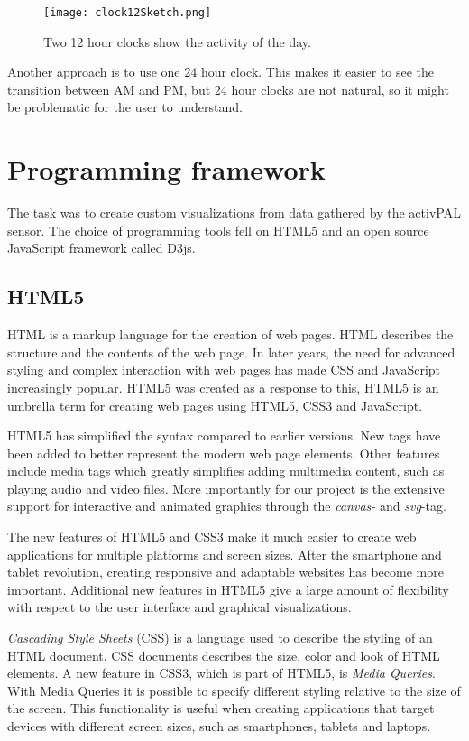 \begin{figure}[h!]
	\centering
		\texttt{[image: clock12Sketch.png]}
		\caption[T3 sketch]{Two 12 hour clocks show the activity of the day.}
		\label{fig:clock12}
\end{figure}

Another approach is to use one 24 hour clock. This makes it easier to see the transition between AM and PM, but 24 hour clocks are not natural, so it might be problematic for the user to understand.

\section{Programming framework}
The task was to create custom visualizations from data gathered by the activPAL sensor. The choice of programming tools fell on HTML5 and an open source JavaScript framework called D3js.

\subsection{HTML5}
HTML is a markup language for the creation of web pages. HTML describes the structure and the contents of the web page. In later years, the need for advanced styling and complex interaction with web pages has made CSS and JavaScript increasingly popular. HTML5 was created as a response to this, HTML5 is an umbrella term for creating web pages using HTML5, CSS3 and JavaScript.

HTML5 has simplified the syntax compared to earlier versions. New tags have been added to better represent the modern web page elements. Other features include media tags which greatly simplifies adding multimedia content, such as playing audio and video files. More importantly for our project is the extensive support for interactive and animated graphics through the \emph{canvas-} and \emph{svg}-tag.

The new features of HTML5 and CSS3 make it much easier to create web applications for multiple platforms and screen sizes. After the smartphone and tablet revolution, creating responsive and adaptable websites has become more important. Additional new features in HTML5 give a large amount of flexibility with respect to the user interface and graphical visualizations.

\emph{Cascading Style Sheets} (CSS) is a language used to describe the styling of an HTML document. CSS documents describes the size, color and look of HTML elements. A new feature in CSS3, which is part of HTML5, is \emph{Media Queries}. With Media Queries it is possible to specify different styling relative to the size of the screen. This functionality is useful when creating applications that target devices with different screen sizes, such as smartphones, tablets and laptops. 

